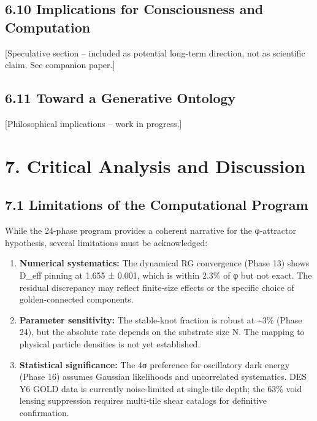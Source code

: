 \documentclass[
  11pt,
]{article}
\providecommand{\tightlist}{%
  \setlength{\itemsep}{0pt}\setlength{\parskip}{0pt}}
\begin{document}
\subsection{6.10 Implications for Consciousness and
Computation}\label{implications-for-consciousness-and-computation}

{[}Speculative section -- included as potential long-term direction, not
as scientific claim. See companion paper.{]}

\subsection{6.11 Toward a Generative
Ontology}\label{toward-a-generative-ontology}

{[}Philosophical implications -- work in progress.{]}

\section{7. Critical Analysis and
Discussion}\label{critical-analysis-and-discussion}

\subsection{7.1 Limitations of the Computational
Program}\label{limitations-of-the-computational-program}

While the 24-phase program provides a coherent narrative for the
φ-attractor hypothesis, several limitations must be acknowledged:

\begin{enumerate}
\def\labelenumi{\arabic{enumi}.}
\tightlist
\item
  \textbf{Numerical systematics:} The dynamical RG convergence (Phase
  13) shows D\_eff pinning at 1.655 ± 0.001, which is within 2.3\% of φ
  but not exact. The residual discrepancy may reflect finite-size
  effects or the specific choice of golden-connected components.
\item
  \textbf{Parameter sensitivity:} The stable-knot fraction is robust at
  \textasciitilde3\% (Phase 24), but the absolute rate depends on the
  substrate size N. The mapping to physical particle densities is not
  yet established.
\item
  \textbf{Statistical significance:} The 4σ preference for oscillatory
  dark energy (Phase 16) assumes Gaussian likelihoods and uncorrelated
  systematics. DES Y6 GOLD data is currently noise-limited at
  single-tile depth; the 63\% void lensing suppression requires
  multi-tile shear catalogs for definitive confirmation.
\end{enumerate}
\end{document}
